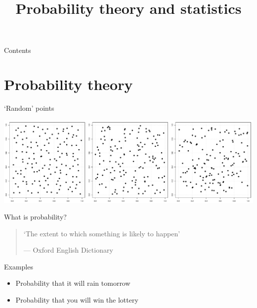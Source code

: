 

\title{Probability theory and statistics}



\maketitle

\begin{frame}{Contents}
    \tableofcontents[hideallsubsections]
\end{frame}

\section{Probability theory}

\begin{frame}{`Random' points}
    \begin{center}
        \includegraphics[width=\textwidth]{figures/random_points}
    \end{center}
\end{frame}

\begin{frame}{What is probability?}
    \begin{quote}
        `The extent to which something is likely to happen'
        \begin{flushright}
            \small%
            --- Oxford English Dictionary
        \end{flushright}
    \end{quote}
    \vfill
    \begin{block}{Examples}
        \begin{itemize}
            \item Probability that it will rain tomorrow
            \item Probability that you will win the lottery
        \end{itemize}
    \end{block}
\end{frame}

